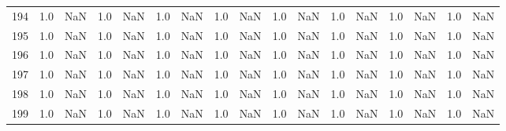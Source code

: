 \begin{tabular}{lrrrrrrrrrrrrrrrr}
    194 &  1.0 & NaN &   1.0 &   NaN &   1.0 &   NaN &   1.0 &   NaN &   1.0 &   NaN &   1.0 &   NaN &   1.0 &   NaN &   1.0 &   NaN \\
    195 &  1.0 & NaN &   1.0 &   NaN &   1.0 &   NaN &   1.0 &   NaN &   1.0 &   NaN &   1.0 &   NaN &   1.0 &   NaN &   1.0 &   NaN \\
    196 &  1.0 & NaN &   1.0 &   NaN &   1.0 &   NaN &   1.0 &   NaN &   1.0 &   NaN &   1.0 &   NaN &   1.0 &   NaN &   1.0 &   NaN \\
    197 &  1.0 & NaN &   1.0 &   NaN &   1.0 &   NaN &   1.0 &   NaN &   1.0 &   NaN &   1.0 &   NaN &   1.0 &   NaN &   1.0 &   NaN \\
    198 &  1.0 & NaN &   1.0 &   NaN &   1.0 &   NaN &   1.0 &   NaN &   1.0 &   NaN &   1.0 &   NaN &   1.0 &   NaN &   1.0 &   NaN \\
    199 &  1.0 & NaN &   1.0 &   NaN &   1.0 &   NaN &   1.0 &   NaN &   1.0 &   NaN &   1.0 &   NaN &   1.0 &   NaN &   1.0 &   NaN \\
\bottomrule
\end{tabular}
